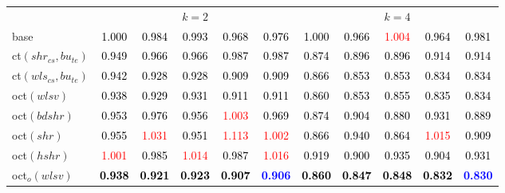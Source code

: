 \begin{tabular}[t]{l|>{}cccc>{}c|ccccc}
\addlinespace[0.3em]
\multicolumn{1}{c}{} & \multicolumn{5}{c}{\textbf{$k = 2$}} & \multicolumn{5}{c}{\textbf{$k = 4$}}\\
base & \textcolor{black}{1.000} & \textcolor{black}{0.984} & \textcolor{black}{0.993} & \textcolor{black}{0.968} & \textcolor{black}{0.976} & \textcolor{black}{1.000} & \textcolor{black}{0.966} & \textcolor{red}{1.004} & \textcolor{black}{0.964} & \textcolor{black}{0.981}\\
ct$(shr_{cs}, bu_{te})$ & \textcolor{black}{0.949} & \textcolor{black}{0.966} & \textcolor{black}{0.966} & \textcolor{black}{0.987} & \textcolor{black}{0.987} & \textcolor{black}{0.874} & \textcolor{black}{0.896} & \textcolor{black}{0.896} & \textcolor{black}{0.914} & \textcolor{black}{0.914}\\
ct$(wls_{cs}, bu_{te})$ & \textcolor{black}{0.942} & \textcolor{black}{0.928} & \textcolor{black}{0.928} & \textcolor{black}{0.909} & \textcolor{black}{0.909} & \textcolor{black}{0.866} & \textcolor{black}{0.853} & \textcolor{black}{0.853} & \textcolor{black}{0.834} & \textcolor{black}{0.834}\\
oct$(wlsv)$ & \textcolor{black}{0.938} & \textcolor{black}{0.929} & \textcolor{black}{0.931} & \textcolor{black}{0.911} & \textcolor{black}{0.911} & \textcolor{black}{0.860} & \textcolor{black}{0.853} & \textcolor{black}{0.855} & \textcolor{black}{0.835} & \textcolor{black}{0.834}\\
oct$(bdshr)$ & \textcolor{black}{0.953} & \textcolor{black}{0.976} & \textcolor{black}{0.956} & \textcolor{red}{1.003} & \textcolor{black}{0.969} & \textcolor{black}{0.874} & \textcolor{black}{0.904} & \textcolor{black}{0.880} & \textcolor{black}{0.931} & \textcolor{black}{0.889}\\
oct$(shr)$ & \textcolor{black}{0.955} & \textcolor{red}{1.031} & \textcolor{black}{0.951} & \textcolor{red}{1.113} & \textcolor{red}{1.002} & \textcolor{black}{0.866} & \textcolor{black}{0.940} & \textcolor{black}{0.864} & \textcolor{red}{1.015} & \textcolor{black}{0.909}\\
oct$(hshr)$ & \textcolor{red}{1.001} & \textcolor{black}{0.985} & \textcolor{red}{1.014} & \textcolor{black}{0.987} & \textcolor{red}{1.016} & \textcolor{black}{0.919} & \textcolor{black}{0.900} & \textcolor{black}{0.935} & \textcolor{black}{0.904} & \textcolor{black}{0.931}\\
oct$_o(wlsv)$ & \textcolor{black}{\textbf{0.938}} & \textcolor{black}{\textbf{0.921}} & \textcolor{black}{\textbf{0.923}} & \textcolor{black}{\textbf{0.907}} & \textcolor{blue}{\textbf{0.906}} & \textcolor{black}{\textbf{0.860}} & \textcolor{black}{\textbf{0.847}} & \textcolor{black}{\textbf{0.848}} & \textcolor{black}{\textbf{0.832}} & \textcolor{blue}{\textbf{0.830}}\\

\end{tabular}
